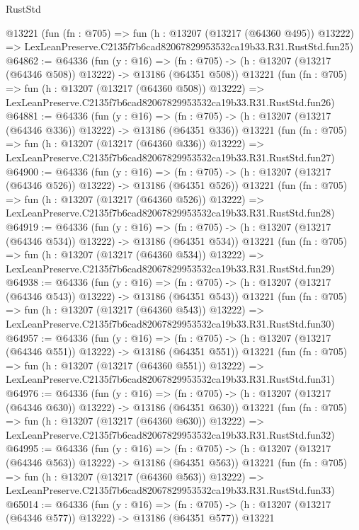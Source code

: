 \begin{lexlean}{RustStd}
\begin{coremodule}
    @13221
    (fun (fn : @705) =>
    fun (h : @13207 (@13217 (@64360 @495)) @13222) =>
    LexLeanPreserve.C2135f7b6cad82067829953532ca19b33.R31.RustStd.fun25)
@64862 := @64336
    (fun (y : @16) =>
    (fn : @705) -> (h : @13207 (@13217 (@64346 @508)) @13222) -> @13186 (@64351 @508))
    @13221
    (fun (fn : @705) =>
    fun (h : @13207 (@13217 (@64360 @508)) @13222) =>
    LexLeanPreserve.C2135f7b6cad82067829953532ca19b33.R31.RustStd.fun26)
@64881 := @64336
    (fun (y : @16) =>
    (fn : @705) -> (h : @13207 (@13217 (@64346 @336)) @13222) -> @13186 (@64351 @336))
    @13221
    (fun (fn : @705) =>
    fun (h : @13207 (@13217 (@64360 @336)) @13222) =>
    LexLeanPreserve.C2135f7b6cad82067829953532ca19b33.R31.RustStd.fun27)
@64900 := @64336
    (fun (y : @16) =>
    (fn : @705) -> (h : @13207 (@13217 (@64346 @526)) @13222) -> @13186 (@64351 @526))
    @13221
    (fun (fn : @705) =>
    fun (h : @13207 (@13217 (@64360 @526)) @13222) =>
    LexLeanPreserve.C2135f7b6cad82067829953532ca19b33.R31.RustStd.fun28)
@64919 := @64336
    (fun (y : @16) =>
    (fn : @705) -> (h : @13207 (@13217 (@64346 @534)) @13222) -> @13186 (@64351 @534))
    @13221
    (fun (fn : @705) =>
    fun (h : @13207 (@13217 (@64360 @534)) @13222) =>
    LexLeanPreserve.C2135f7b6cad82067829953532ca19b33.R31.RustStd.fun29)
@64938 := @64336
    (fun (y : @16) =>
    (fn : @705) -> (h : @13207 (@13217 (@64346 @543)) @13222) -> @13186 (@64351 @543))
    @13221
    (fun (fn : @705) =>
    fun (h : @13207 (@13217 (@64360 @543)) @13222) =>
    LexLeanPreserve.C2135f7b6cad82067829953532ca19b33.R31.RustStd.fun30)
@64957 := @64336
    (fun (y : @16) =>
    (fn : @705) -> (h : @13207 (@13217 (@64346 @551)) @13222) -> @13186 (@64351 @551))
    @13221
    (fun (fn : @705) =>
    fun (h : @13207 (@13217 (@64360 @551)) @13222) =>
    LexLeanPreserve.C2135f7b6cad82067829953532ca19b33.R31.RustStd.fun31)
@64976 := @64336
    (fun (y : @16) =>
    (fn : @705) -> (h : @13207 (@13217 (@64346 @630)) @13222) -> @13186 (@64351 @630))
    @13221
    (fun (fn : @705) =>
    fun (h : @13207 (@13217 (@64360 @630)) @13222) =>
    LexLeanPreserve.C2135f7b6cad82067829953532ca19b33.R31.RustStd.fun32)
@64995 := @64336
    (fun (y : @16) =>
    (fn : @705) -> (h : @13207 (@13217 (@64346 @563)) @13222) -> @13186 (@64351 @563))
    @13221
    (fun (fn : @705) =>
    fun (h : @13207 (@13217 (@64360 @563)) @13222) =>
    LexLeanPreserve.C2135f7b6cad82067829953532ca19b33.R31.RustStd.fun33)
@65014 := @64336
    (fun (y : @16) =>
    (fn : @705) -> (h : @13207 (@13217 (@64346 @577)) @13222) -> @13186 (@64351 @577))
    @13221

\end{coremodule}
\end{lexlean}
